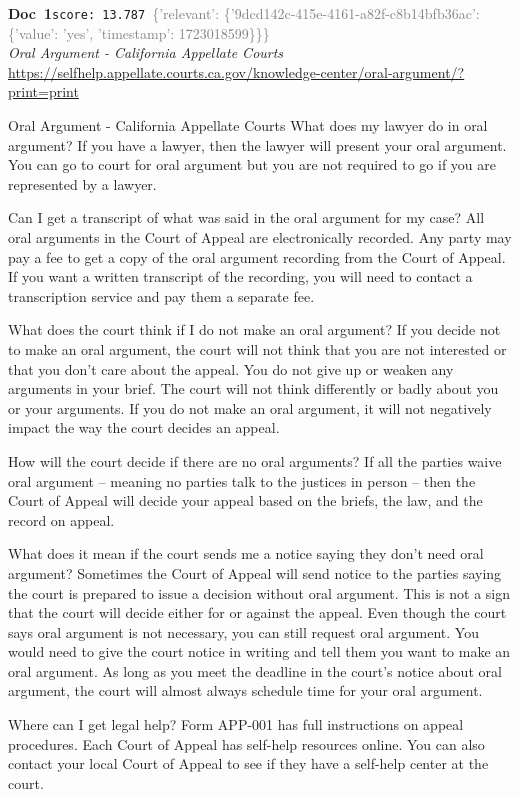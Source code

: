 \documentclass[a4paper,11pt]{article}
\begin{document}
\begin{docenv}
{\footnotesize\textcolor{doccolor}{\textbf{Doc~1}}}\hfill{\tiny\texttt{score:~13.787}}\ {\tiny\textcolor{gray}{\{'relevant': \{'9dcd142c-415e-4161-a82f-c8b14bfb36ac': \{'value': 'yes', 'timestamp': 1723018599\}\}\}}}\\[3pt]
{\small\textit{Oral Argument - California Appellate Courts}}\\[2pt]
{\tiny\url{https://selfhelp.appellate.courts.ca.gov/knowledge-center/oral-argument/?print=print}}\\[4pt]
{\footnotesize Oral Argument - California Appellate Courts
What does my lawyer do in oral argument? If you have a lawyer, then the lawyer will present your oral argument. You can go to court for oral argument but you are not required to go if you are represented by a lawyer.
 
 Can I get a transcript of what was said in the oral argument for my case? All oral arguments in the Court of Appeal are electronically recorded. Any party may pay a fee to get a copy of the oral argument recording from the Court of Appeal. If you want a written transcript of the recording, you will need to contact a transcription service and pay them a separate fee.
 
 What does the court think if I do not make an oral argument? If you decide not to make an oral argument, the court will not think that you are not interested or that you don’t care about the appeal. You do not give up or weaken any arguments in your brief. The court will not think differently or badly about you or your arguments. If you do not make an oral argument, it will not negatively impact the way the court decides an appeal.
 
 How will the court decide if there are no oral arguments? If all the parties waive oral argument – meaning no parties talk to the justices in person – then the Court of Appeal will decide your appeal based on the briefs, the law, and the record on appeal.
 
 What does it mean if the court sends me a notice saying they don’t need oral argument? Sometimes the Court of Appeal will send notice to the parties saying the court is prepared to issue a decision without oral argument. This is not a sign that the court will decide either for or against the appeal.
Even though the court says oral argument is not necessary, you can still request oral argument. You would need to give the court notice in writing and tell them you want to make an oral argument. As long as you meet the deadline in the court’s notice about oral argument, the court will almost always schedule time for your oral argument.
 
 Where can I get legal help? Form APP-001 has full instructions on appeal procedures.
Each Court of Appeal has self-help resources online. You can also contact your local Court of Appeal to see if they have a self-help center at the court.}
\end{docenv}
\end{document}
